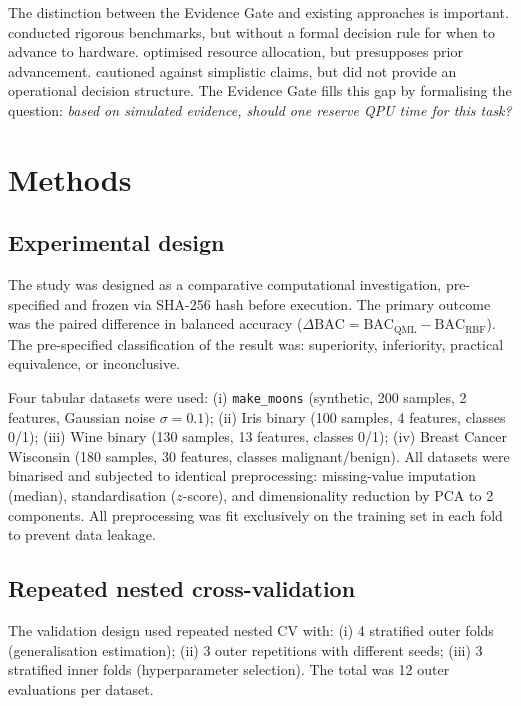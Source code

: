 \documentclass[11pt,a4paper]{article}
\newcommand{\BAC}{\mathrm{BAC}}
\begin{document}
The distinction between the Evidence Gate and existing approaches is important.
\citet{kakavand2026benchmarking} conducted rigorous benchmarks, but without a
formal decision rule for when to advance to hardware.
\citet{aqka2026active} optimised resource allocation, but presupposes prior
advancement. \citet{bowles2024better} cautioned against simplistic claims, but
did not provide an operational decision structure. The Evidence Gate fills this
gap by formalising the question: \textit{based on simulated evidence, should
one reserve QPU time for this task?}

\section{Methods}
\label{sec:methods}

\subsection{Experimental design}
\label{ssec:design}

The study was designed as a comparative computational investigation,
pre-specified and frozen via SHA-256 hash before execution. The primary outcome
was the paired difference in balanced accuracy ($\Delta\BAC = \BAC_{\mathrm{QML}} -
\BAC_{\mathrm{RBF}}$). The pre-specified classification of the result was:
superiority, inferiority, practical equivalence, or inconclusive.

Four tabular datasets were used: (i) \texttt{make\_moons} (synthetic, 200
samples, 2 features, Gaussian noise $\sigma=0.1$); (ii) Iris binary (100
samples, 4 features, classes 0/1); (iii) Wine binary (130 samples, 13
features, classes 0/1); (iv) Breast Cancer Wisconsin (180 samples, 30
features, classes malignant/benign). All datasets were binarised and subjected
to identical preprocessing: missing-value imputation (median), standardisation
($z$-score), and dimensionality reduction by PCA to 2 components. All
preprocessing was fit exclusively on the training set in each fold to prevent
data leakage.

\subsection{Repeated nested cross-validation}
\label{ssec:ncv}

The validation design used repeated nested CV with: (i) 4 stratified outer
folds (generalisation estimation); (ii) 3 outer repetitions with different
seeds; (iii) 3 stratified inner folds (hyperparameter selection). The total
was 12 outer evaluations per dataset.
\end{document}
